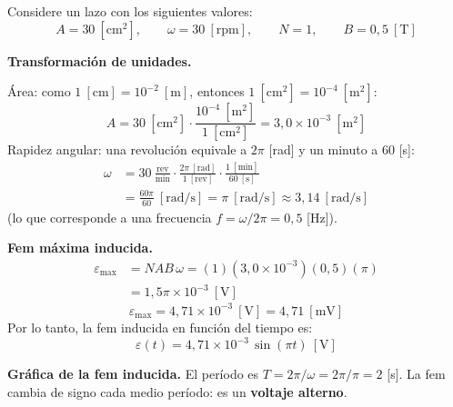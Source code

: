 \documentclass[12pt,letterpaper]{article}
\newcommand{\eps}{\varepsilon}
\begin{document}
\noindent Considere un lazo con los siguientes valores:
\[
    A = 30\ [\text{cm}^2],\qquad \omega = 30\ [\text{rpm}],\qquad N = 1,\qquad B = 0{,}5\ [\text{T}]
\]

\noindent\textbf{Transformaci\'on de unidades.}

\noindent\'Area: como $1\ [\text{cm}] = 10^{-2}\ [\text{m}]$, entonces $1\ [\text{cm}^2] = 10^{-4}\ [\text{m}^2]$:
\[
    A = 30\ [\text{cm}^2]\cdot\frac{10^{-4}\ [\text{m}^2]}{1\ [\text{cm}^2]} = 3{,}0\times10^{-3}\ [\text{m}^2]
\]
Rapidez angular: una revoluci\'on equivale a $2\pi$ [rad] y un minuto a $60$ [s]:
\begin{align*}
    \omega &= 30\ \frac{\text{rev}}{\text{min}}\cdot\frac{2\pi\ [\text{rad}]}{1\ [\text{rev}]}
              \cdot\frac{1\ [\text{min}]}{60\ [\text{s}]}\\[4pt]
           &= \frac{60\pi}{60}\ [\text{rad/s}] = \pi\ [\text{rad/s}] \approx 3{,}14\ [\text{rad/s}]
\end{align*}
(lo que corresponde a una frecuencia $f = \omega/2\pi = 0{,}5$ [Hz]).

\medskip
\noindent\textbf{Fem m\'axima inducida.}
\begin{align*}
    \eps_{\max} &= N A B\,\omega = (1)(3{,}0\times10^{-3})(0{,}5)(\pi)\\[4pt]
                &= 1{,}5\pi\times10^{-3}\ [\text{V}]
\end{align*}
\[
    \boxed{\eps_{\max} = 4{,}71\times10^{-3}\ [\text{V}] = 4{,}71\ [\text{mV}]}
\]
\noindent Por lo tanto, la fem inducida en funci\'on del tiempo es:
\[
    \boxed{\eps(t) = 4{,}71\times10^{-3}\,\sin(\pi t)\ [\text{V}]}
\]

\noindent\textbf{Gr\'afica de la fem inducida.} El per\'iodo es $T = 2\pi/\omega = 2\pi/\pi = 2$ [s].
La fem cambia de signo cada medio per\'iodo: es un \textbf{voltaje alterno}.
\end{document}
